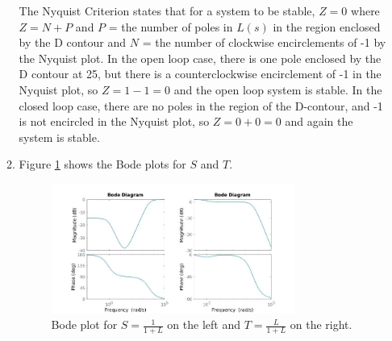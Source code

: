 \documentclass[11pt]{article}
\theoremstyle{definition}
\begin{document}
\begin{enumerate}
\begin{enumerate}
        The Nyquist Criterion states that for a system to be stable, $Z = 0$ where $Z = N + P$ and $P$ =  the number of poles in $L(s)$ in the region enclosed by the D contour and $N$ = the number of clockwise encirclements of -1 by the Nyquist plot.  In the open loop case, there is one pole enclosed by the D contour at 25, but there is a counterclockwise encirclement of -1 in the Nyquist plot, so $Z = 1-1=0$ and the open loop system is stable.  In the closed loop case, there are no poles in the region of the D-contour, and -1 is not encircled in the Nyquist plot, so $Z = 0 + 0 = 0$ and again the system is stable.

        \item %

        Figure \ref{fig:3c} shows the Bode plots for $S$ and $T$.

        \begin{figure}[H]
            \centering
            \includegraphics[width = 0.8\textwidth]{ES155P8_3c.jpg}
            \caption{Bode plot for $S = \frac{1}{1 + L}$ on the left and $T = \frac{L}{1+L}$ on the right.}
            \label{fig:3c}
        \end{figure}

    \end{enumerate}

\end{enumerate}
\end{document}
